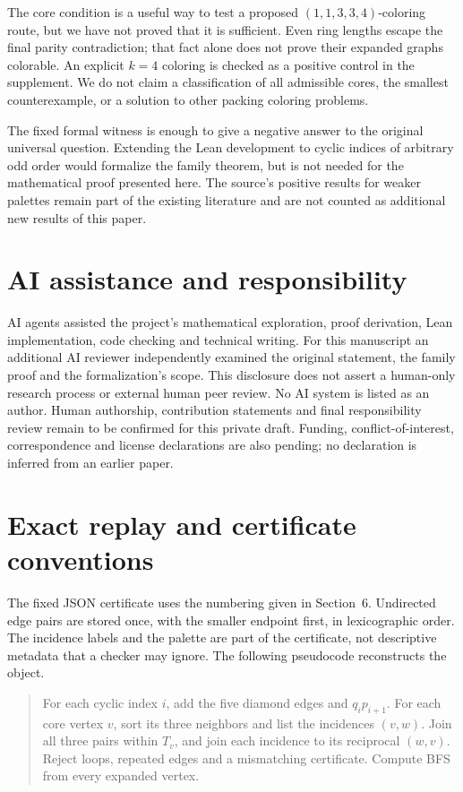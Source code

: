\documentclass[11pt,a4paper]{article}
\theoremstyle{definition}
\theoremstyle{remark}
\newcommand{\palette}{(1,1,3,3,4)}
\begin{document}
The core condition is a useful way to test a proposed
\(\palette\)-coloring route, but we have not proved that it is
sufficient. Even ring lengths escape the final parity contradiction;
that fact alone does not prove their expanded graphs colorable.
An explicit \(k=4\) coloring is checked as a positive control in
the supplement. We do not claim a classification of all admissible
cores, the smallest counterexample, or a solution to other packing
coloring problems.

The fixed formal witness is enough to give a negative answer to
the original universal question. Extending the Lean development
to cyclic indices of arbitrary odd order would formalize the
family theorem, but is not needed for the mathematical proof
presented here. The source's positive results for weaker palettes
remain part of the existing literature and are not counted as
additional new results of this paper.

\section*{AI assistance and responsibility}

AI agents assisted the project's mathematical exploration, proof
derivation, Lean implementation, code checking and technical writing.
For this manuscript an additional AI reviewer independently examined
the original statement, the family proof and the formalization's
scope. This disclosure does not assert a human-only research process
or external human peer review. No AI system is listed as an author.
Human authorship, contribution statements and final responsibility
review remain to be confirmed for this private draft. Funding,
conflict-of-interest, correspondence and license declarations are
also pending; no declaration is inferred from an earlier paper.

\appendix
\section{Exact replay and certificate conventions}\label{app:replay}

The fixed JSON certificate uses the numbering given in Section~6.
Undirected edge pairs are stored once, with the smaller endpoint
first, in lexicographic order. The incidence labels and the palette
are part of the certificate, not descriptive metadata that a checker
may ignore. The following pseudocode reconstructs the object.
\begin{quote}\small
For each cyclic index \(i\), add the five diamond edges and
\(q_ip_{i+1}\). For each core vertex \(v\), sort its three neighbors
and list the incidences \((v,w)\). Join all three pairs within
\(T_v\), and join each incidence to its reciprocal \((w,v)\).
Reject loops, repeated edges and a mismatching certificate. Compute
BFS from every expanded vertex.
\end{quote}
\end{document}

